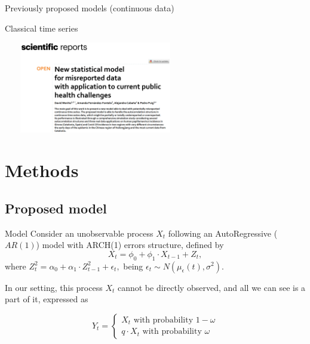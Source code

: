 \documentclass[aspectratio=169,usepdftitle=true]{beamer}
\begin{document}
\begin{frame}[c]{Previously proposed models (continuous data)}
    \begin{block}{Classical time series}
        \begin{center}
           \includegraphics[height=4cm,width=8cm]{SR.png}
        \end{center}
    \end{block}
\end{frame}

\section{Methods}

\subsection{Proposed model}
\begin{frame}{Model}
Consider an unobservable process $X_t$ following an AutoRegressive ($AR(1)$) model with ARCH(1) errors structure, defined by
\begin{equation}\label{eq:ARCH}
X_t = \phi_0 + \phi_1 \cdot X_{t-1} + Z_t,
\end{equation}
where $Z^2_t=\alpha_0+\alpha_1 \cdot Z^2_{t-1} + \epsilon_t,$ being $\epsilon_t \sim N(\mu_{\epsilon}(t), \sigma^2)$.

In our setting, this process $X_t$ cannot be directly observed, and all we can see is a part of it, expressed as

\begin{equation}\label{eq:model}
    Y_t=\left\{
                \begin{array}{ll}
                  X_t \text{ with probability } 1-\omega \\
                  q \cdot X_t \text{ with probability } \omega
                \end{array}
              \right.
\end{equation}
\end{frame}
\end{document}

